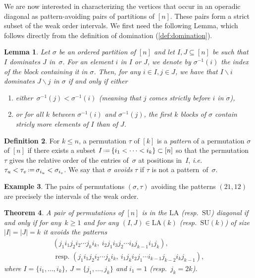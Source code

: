 \documentclass{amsart}
\newcommand{\darkblue}{\color{darkblue}} %
\newtheorem{theorem}{Theorem}[section]
\newtheorem{lemma}[theorem]{Lemma}
\theoremstyle{definition}
\newtheorem{definition}[theorem]{Definition}
\newtheorem{example}[theorem]{Example}
\newcommand{\ssm}{\smallsetminus} %
\newcommand{\eqdef}{\mbox{\,\raisebox{0.2ex}{\scriptsize\ensuremath{\mathrm:}}\ensuremath{=}\,}} %
\newcommand{\ie}{\textit{i.e.}~} %
\newcommand{\resp}{resp.~} %
\newcommand{\defn}[1]{\textsl{\darkblue #1}} %
\newcommand{\SU}{\mathrm{SU}}
\newcommand{\LA}{\mathrm{LA}}
\begin{document}
We are now interested in characterizing the vertices that occur in an operadic diagonal as pattern-avoiding pairs of partitions of $[n]$. 
These pairs form a strict subset of the weak order intervals. 
We first need the following Lemma, which follows directly from the definition of domination (\cref{def:domination}).

\begin{lemma}
\label{lem:Coherent Domination}
Let $\sigma$ be an ordered partition of $[n]$ and let $I,J \subseteq [n]$ be such that $I$ dominates $J$ in~$\sigma$. 
For an element $i$ in $I$ or $J$, we denote by $\sigma^{-1}(i)$ the index of the block containing it in $\sigma$. 
Then, for any $i \in I,j \in J$, we have that $I\ssm i$ dominates $J\ssm j$ in $\sigma$ if and only if either
\begin{enumerate}
	\item either~$\sigma^{-1}(j) < \sigma^{-1}(i)$ (meaning that $j$ comes strictly before $i$ in $\sigma$),
	\item or for all $k$ between $\sigma^{-1}(i)$ and $\sigma^{-1}(j)$, the first $k$ blocks of $\sigma$ contain stricly more elements of $I$ than of $J$.
\end{enumerate}
\end{lemma}


\begin{definition}
For $k\leq n$, a permutation $\tau$ of $[k]$ is a \defn{pattern} of a permutation $\sigma$ of $[n]$ if there exists a subset $I \eqdef \{i_1 < \dots < i_k\} \subset [n]$ so that the permutation~$\tau$ gives the relative order of the entries of~$\sigma$ at positions in~$I$, \ie $\tau_u < \tau_v \eqdef \sigma_{i_u} < \sigma_{i_v}$.
We say that $\sigma$ \defn{avoids} $\tau$ if $\tau$ is not a pattern~of~$\sigma$. 
\end{definition}

\begin{example}
The pairs of permutations $(\sigma,\tau)$ avoiding the patterns $(21,12)$ are precisely the intervals of the weak order. 
\end{example}

\begin{theorem}
\label{prop: LAD Fish Pattern}
A pair of permutations of $[n]$ is in the $\LA$ (\resp $\SU$) diagonal if and only if for any~$k\geq 1$ and for any $(I,J) \in \LA(k)$ (\resp $\SU(k)$) of size $|I|=|J|=k$ it avoids the patterns 
\begin{align}
	(j_1 i_1 j_2 i_2 \cdots j_k i_k,\ i_2 j_1 i_3 j_2 \cdots i_k j_{k-1} i_1 j_k), \tag{LA} \label{eq:pattern} \\
	\text{ \resp } (j_1 i_1 j_2 i_2 \cdots j_k i_k, \ i_1 j_k i_2 j_1 \cdots i_{k-1} j_{k-2}i_k j_{k-1}), \tag{SU}
\end{align}
where $I=\{i_1,\dots,i_k\}$, $J=\{j_1,\dots,j_k\}$ and $i_1=1$ (\resp $j_k=2k$).
\end{theorem}
\end{document}
